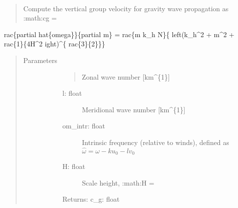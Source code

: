 \documentclass[letterpaper,10pt,english]{sphinxmanual}
\begin{document}

\begin{fulllineitems}
\label{\detokenize{stochprop.gravity:stochprop.gravity_waves.cg}}~\begin{quote}

\sphinxAtStartPar
Compute the vertical group velocity for gravity wave propagation 
as :math:{\color{red}\bfseries{}\textasciigrave{}}cg =
\end{quote}

\sphinxAtStartPar
rac\{partial hat\{omega\}\}\{partial m\} = 
rac\{m k\_h N\}\{ left(k\_h\textasciicircum{}2 + m\textasciicircum{}2 + 
rac\{1\}\{4H\textasciicircum{}2 
ight)\textasciicircum{}\{
rac\{3\}\{2\}\}\}\textasciigrave{}
\begin{quote}\begin{description}
\item[{Parameters}] \leavevmode\begin{description}
\item[{}] \leavevmode\begin{quote}

\sphinxAtStartPar
Zonal wave number {[}km\textasciicircum{}\{\sphinxhyphen{}1\}{]}
\end{quote}
\begin{description}
\item[{l: float}] \leavevmode
\sphinxAtStartPar
Meridional wave number {[}km\textasciicircum{}\{\sphinxhyphen{}1\}{]}

\item[{om\_intr: float}] \leavevmode
\sphinxAtStartPar
Intrinsic frequency (relative to winds), defined as \(\hat{\omega} = \omega - k u_0 - l v_0\)

\item[{H: float}] \leavevmode
\sphinxAtStartPar
Scale height, :math:{\color{red}\bfseries{}\textasciigrave{}}H =

\end{description}

\item[{}] \leavevmode
\item[{}] \leavevmode
\item[{}] \leavevmode
\item[{}] \leavevmode
\sphinxAtStartPar
Returns:
c\_g: float
\begin{quote}


\end{quote}
\end{description}
\end{description}
\end{quote}
\end{fulllineitems}
\end{document}
